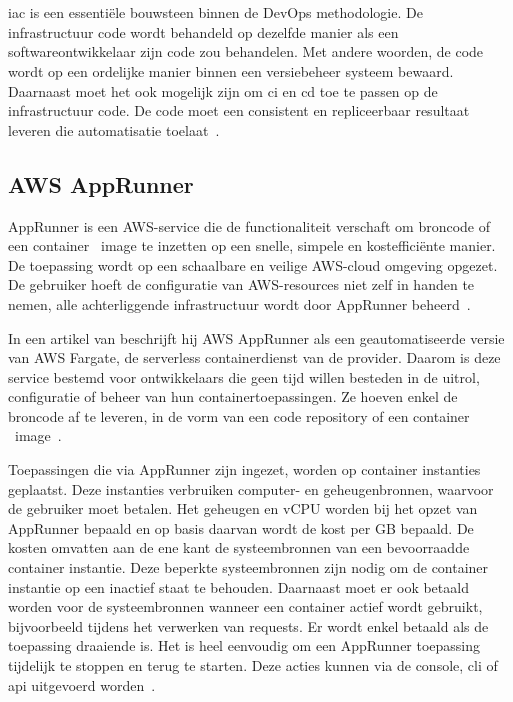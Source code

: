\chapter{}
\label{ch:stand-van-zaken}

\acrfull{iac} is een essentiële bouwsteen binnen de DevOps methodologie.
De infrastructuur code wordt behandeld op dezelfde manier als een softwareontwikkelaar zijn code zou behandelen.
Met andere woorden, de code wordt op een ordelijke manier binnen een versiebeheer systeem bewaard.
Daarnaast moet het ook mogelijk zijn om \acrfull{ci} en \acrfull{cd} toe te passen op de infrastructuur code.
De code moet een consistent en repliceerbaar resultaat leveren die automatisatie toelaat~\autocite{Mansoor2014}.

\section{AWS AppRunner}
\label{sec:service-apprunner}

AppRunner is een AWS-service die de functionaliteit verschaft om broncode of een container ~\gls{image} te inzetten op een snelle, simpele en kostefficiënte manier.
De toepassing wordt op een schaalbare en veilige AWS-cloud omgeving opgezet.
De gebruiker hoeft de configuratie van AWS-resources niet zelf in handen te nemen, alle achterliggende infrastructuur wordt door AppRunner beheerd~\autocite{Khen2022}.

In een artikel van \textcite{Aussems2021} beschrijft hij AWS AppRunner als een geautomatiseerde versie van AWS Fargate, de serverless containerdienst van de provider.
Daarom is deze service bestemd voor ontwikkelaars die geen tijd willen besteden in de uitrol, configuratie of beheer van hun containertoepassingen.
Ze hoeven enkel de broncode af te leveren, in de vorm van een code repository of een container ~\gls{image}~\autocite{Khen2022}.

Toepassingen die via AppRunner zijn ingezet, worden op container instanties geplaatst.
Deze instanties verbruiken computer- en geheugenbronnen, waarvoor de gebruiker moet betalen.
Het geheugen en vCPU worden bij het opzet van AppRunner bepaald en op basis daarvan wordt de kost per GB bepaald.
De kosten omvatten aan de ene kant de systeembronnen van een bevoorraadde container instantie.
Deze beperkte systeembronnen zijn nodig om de container instantie op een inactief staat te behouden.
Daarnaast moet er ook betaald worden voor de systeembronnen wanneer een container actief wordt gebruikt, bijvoorbeeld tijdens het verwerken van requests.
Er wordt enkel betaald als de toepassing draaiende is.
Het is heel eenvoudig om een AppRunner toepassing tijdelijk te stoppen en terug te starten.
Deze acties kunnen via de console, \acrshort{cli} of \acrshort{api} uitgevoerd worden~\autocite{AWSAppRunnerPricing}.

